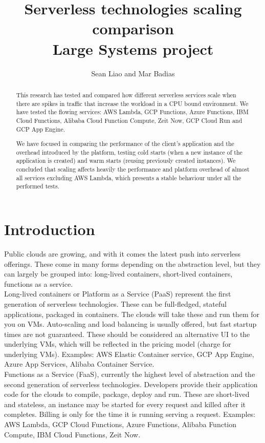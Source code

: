 \documentclass[11pt]{article}
\title{
  Serverless technologies scaling comparison\\
  \large Large Systems project}
\author{Sean Liao and Mar Badias}
\begin{document}
\maketitle


\begin{abstract}
This research has tested and compared how different serverless services scale when there are spikes in traffic that increase the workload in a CPU bound environment. We have tested the flowing services: AWS Lambda, GCP Functions, Azure Functions, IBM Cloud Functions, Alibaba Cloud Function Compute, Zeit Now, GCP Cloud Run and GCP App Engine.

We have focused in comparing the performance of the client's application and the overhead introduced by the platform, testing cold starts (when a new instance of the application is created) and warm starts (reusing previously created instances). We concluded that scaling affects heavily the performance and platform overhead of almost all services excluding AWS Lambda, which presents a stable behaviour under all the performed tests.
\end{abstract}


\section{Introduction}
\label{introduction}

Public clouds are growing, and with it comes the latest push into serverless offerings. These come in many forms depending on the abstraction level, but they can largely be grouped into: long-lived containers, short-lived containers, functions as a service. \\

Long-lived containers or Platform as a Service (PaaS) represent the first generation of serverless technologies. These can be full-fledged, stateful applications, packaged in containers. The clouds will take these and run them for you on VMs. Auto-scaling and load balancing is usually offered, but fast startup times are not guaranteed. These should be considered an alternative UI to the underlying VMs, which will be reflected in the pricing model (charge for underlying VMs). Examples: AWS Elastic Container service, GCP App Engine, Azure App Services, Alibaba Container Service. \\

Functions as a Service (FaaS), currently the highest level of abstraction and the second generation of serverless technologies. Developers provide their application code for the clouds to compile, package, deploy and run. These are short-lived and stateless, an instance may be started for every request and killed after it completes. Billing is only for the time it is running serving a request. Examples: AWS Lambda, GCP Cloud Functions, Azure Functions, Alibaba Function Compute, IBM Cloud Functions, Zeit Now.\\
\end{document}
